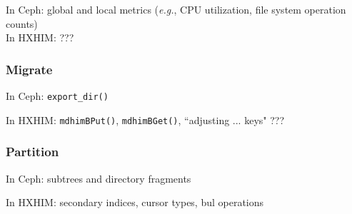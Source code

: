 In Ceph: global and local metrics ({\it e.g.}, CPU utilization, file system operation counts) \\

In HXHIM: ???\\

\subsubsection{Migrate}

In Ceph: \texttt{export\_dir()}

In HXHIM: \texttt{mdhimBPut()}, \texttt{mdhimBGet()}, ``adjusting ... keys" ???

\subsubsection{Partition}

In Ceph: subtrees and directory fragments

In HXHIM: secondary indices, cursor types, bul operations
